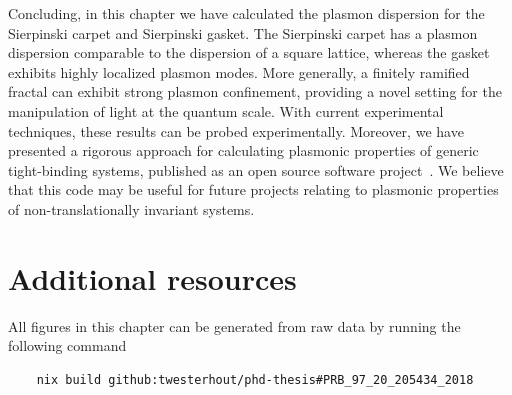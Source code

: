 Concluding, in this chapter we have calculated the plasmon dispersion for the Sierpinski carpet and Sierpinski gasket. The Sierpinski carpet has a plasmon dispersion comparable to the dispersion of a square lattice, whereas the gasket exhibits highly localized plasmon modes. More generally, a finitely ramified fractal can exhibit strong plasmon confinement, providing a novel setting for the manipulation of light at the quantum scale. With current experimental techniques, these results can be probed experimentally. Moreover, we have presented a rigorous approach for calculating plasmonic properties of generic tight-binding systems, published as an open source software project~\cite{Westerhout2017}. We believe that this code may be useful for future projects relating to plasmonic properties of non-translationally invariant systems.

\section{Additional resources}



\noindent All figures in this chapter can be generated from raw data by running the following command
\begin{verbatim}
    nix build github:twesterhout/phd-thesis#PRB_97_20_205434_2018
\end{verbatim}
